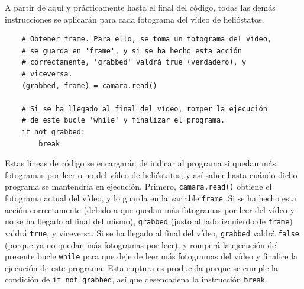 A partir de aquí y prácticamente hasta el final del código, todas las demás instrucciones se aplicarán para cada fotograma del vídeo de helióstatos.
    
\begin{lstlisting}
    # Obtener frame. Para ello, se toma un fotograma del vídeo,
    # se guarda en 'frame', y si se ha hecho esta acción
    # correctamente, 'grabbed' valdrá true (verdadero), y
    # viceversa.
    (grabbed, frame) = camara.read()

    # Si se ha llegado al final del vídeo, romper la ejecución
    # de este bucle 'while' y finalizar el programa.
    if not grabbed:
        break
\end{lstlisting}

Estas líneas de código se encargarán de indicar al programa si quedan más fotogramas por leer o no del vídeo de helióstatos, y así saber hasta cuándo dicho programa se mantendría en ejecución. Primero, \verb|camara.read()| obtiene el fotograma actual del vídeo, y lo guarda en la variable \verb|frame|. Si se ha hecho esta acción correctamente (debido a que quedan más fotogramas por leer del vídeo y no se ha llegado al final del mismo), \verb|grabbed| (justo al lado izquierdo de \verb|frame|) valdrá \verb|true|, y viceversa. Si se ha llegado al final del vídeo, \verb|grabbed| valdrá \verb|false| (porque ya no quedan más fotogramas por leer), y romperá la ejecución del presente bucle \verb|while| para que deje de leer más fotogramas del vídeo y finalice la ejecución de este programa. Esta ruptura es producida porque se cumple la condición de \verb|if not grabbed|, así que desencadena la instrucción \verb|break|.

